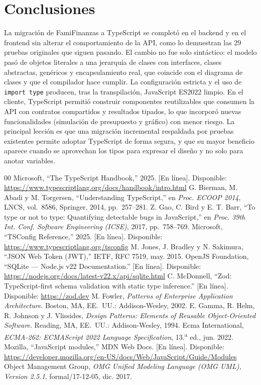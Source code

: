 \documentclass[conference,a4paper]{IEEEtran}
\begin{document}
\section{Conclusiones}\label{sec:conclusiones}
La migración de FamiFinanzas a TypeScript se completó en el backend y en el frontend sin alterar el comportamiento de la API, como lo demuestran las 29 pruebas originales que siguen pasando. El cambio no fue solo sintáctico: el modelo pasó de objetos literales a una jerarquía de clases con interfaces, clases abstractas, genéricos y encapsulamiento real, que coincide con el diagrama de clases y que el compilador hace cumplir. La configuración estricta y el uso de \texttt{import type} producen, tras la transpilación, JavaScript ES2022 limpio. En el cliente, TypeScript permitió construir componentes reutilizables que consumen la API con contratos compartidos y resultados tipados, lo que incorporó nuevas funcionalidades (simulación de presupuesto y gráfico) con menor riesgo. La principal lección es que una migración incremental respaldada por pruebas existentes permite adoptar TypeScript de forma segura, y que su mayor beneficio aparece cuando se aprovechan los tipos para expresar el diseño y no solo para anotar variables.

\begin{thebibliography}{00}
 Microsoft, ``The TypeScript Handbook,'' 2025. [En línea]. Disponible: \url{https://www.typescriptlang.org/docs/handbook/intro.html}
 G. Bierman, M. Abadi y M. Torgersen, ``Understanding TypeScript,'' en \emph{Proc. ECOOP 2014}, LNCS, vol.~8586, Springer, 2014, pp.~257--281.
 Z. Gao, C. Bird y E. T. Barr, ``To type or not to type: Quantifying detectable bugs in JavaScript,'' en \emph{Proc. 39th Int. Conf. Software Engineering (ICSE)}, 2017, pp.~758--769.
 Microsoft, ``TSConfig Reference,'' 2025. [En línea]. Disponible: \url{https://www.typescriptlang.org/tsconfig}
 M. Jones, J. Bradley y N. Sakimura, ``JSON Web Token (JWT),'' IETF, RFC 7519, may. 2015.
 OpenJS Foundation, ``SQLite --- Node.js v22 Documentation.'' [En línea]. Disponible: \url{https://nodejs.org/docs/latest-v22.x/api/sqlite.html}
 C. McDonnell, ``Zod: TypeScript-first schema validation with static type inference.'' [En línea]. Disponible: \url{https://zod.dev}
 M. Fowler, \emph{Patterns of Enterprise Application Architecture}. Boston, MA, EE.~UU.: Addison-Wesley, 2002.
 E. Gamma, R. Helm, R. Johnson y J. Vlissides, \emph{Design Patterns: Elements of Reusable Object-Oriented Software}. Reading, MA, EE.~UU.: Addison-Wesley, 1994.
 Ecma International, \emph{ECMA-262: ECMAScript 2022 Language Specification}, 13.\textsuperscript{a} ed., jun. 2022.
 Mozilla, ``JavaScript modules,'' MDN Web Docs. [En línea]. Disponible: \url{https://developer.mozilla.org/en-US/docs/Web/JavaScript/Guide/Modules}
 Object Management Group, \emph{OMG Unified Modeling Language (OMG UML), Version 2.5.1}, formal/17-12-05, dic. 2017.
\end{thebibliography}
\end{document}
